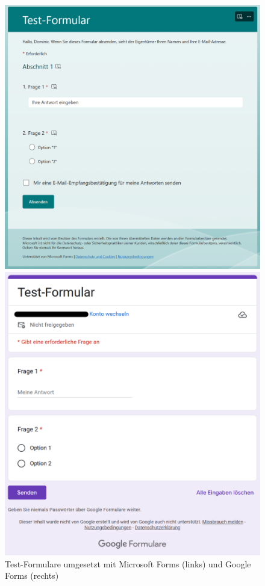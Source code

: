 \documentclass[a4paper,12pt,twoside]{scrreprt}
\begin{document}
\begin{figure}[ht]
    \centering
    \begin{minipage}{.49\textwidth}
        \centering
        \includegraphics[width=.95\linewidth]{thesis/images/Luidold_Microsoft-Forms-Testformular.png}
    \end{minipage}
    \begin{minipage}{.49\textwidth}
        \centering
        \includegraphics[width=.95\linewidth]{thesis/images/Luidold_Google-Forms-Testformular.png}
    \end{minipage}
    \caption{Test-Formulare umgesetzt mit Microsoft Forms (links) und Google Forms (rechts)}
    \label{fig:microsoft-google-forms-testformulare}
\end{figure}
\end{document}
